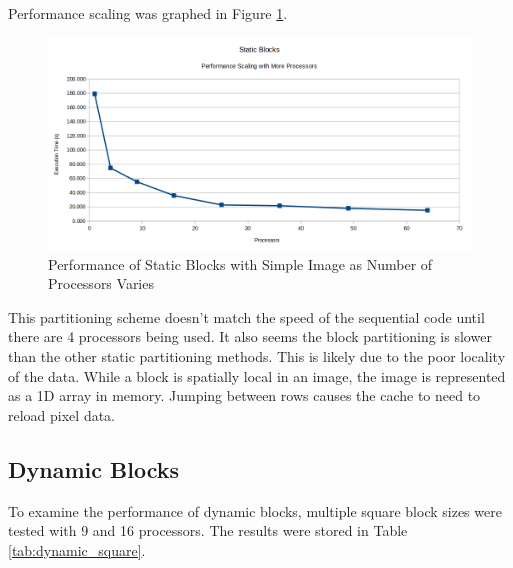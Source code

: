 \documentclass[11pt]{article}
\begin{document}
		Performance scaling was graphed in Figure \ref{fig:blocksscaling}.
		
		\begin{figure}[H]
			\centering
			\includegraphics[width=0.7\linewidth]{Pictures/blocks_scaling}
			\caption{Performance of Static Blocks with Simple Image as Number of Processors Varies}
			\label{fig:blocksscaling}
		\end{figure}
	
		This partitioning scheme doesn't match the speed of the sequential code until there are 4 processors being used. It also seems the block partitioning is slower than the other static partitioning methods. This is likely due to the poor locality of the data. While a block is spatially local in an image, the image is represented as a 1D array in memory. Jumping between rows causes the cache to need to reload pixel data. 
	
		
	
	\subsection{Dynamic Blocks}
	
		To examine the performance of dynamic blocks, multiple square block sizes were tested with 9 and 16 processors. The results were stored in Table \ref{tab:dynamic_square}.
	
\end{document}
